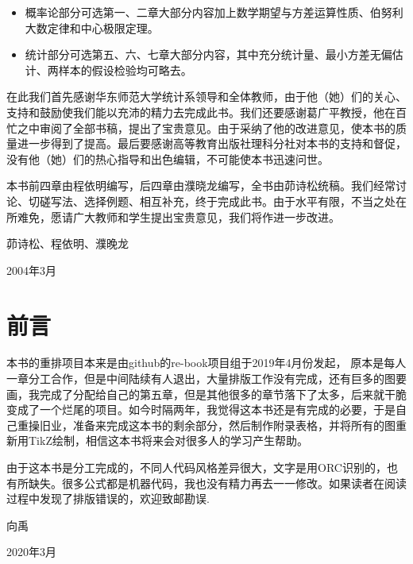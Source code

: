 \begin{itemize}
  \item 概率论部分可选第一、二章大部分内容加上数学期望与方差运算性质、伯努利大数定律和中心极限定理。
  \item 统计部分可选第五、六、七章大部分内容，其中充分统计量、最小方差无偏估计、两样本的假设检验均可略去。
\end{itemize}

在此我们首先感谢华东师范大学统计系领导和全体教师，由于他（她）们的关心、支持和鼓励使我们能以充沛的精力去完成此书。我们还要感谢葛广平教授，他在百忙之中审阅了全部书稿，提出了宝贵意见。由于采纳了他的改进意见，使本书的质量进一步得到了提高。最后要感谢高等教育出版社理科分社对本书的支持和督促，没有他（她）们的热心指导和出色编辑，不可能使本书迅速问世。

本书前四章由程依明编写，后四章由濮晓龙编写，全书由茆诗松统稿。我们经常讨论、切磋写法、选择例题、相互补充，终于完成此书。由于水平有限，不当之处在所难免，愿请广大教师和学生提出宝贵意见，我们将作进一步改进。

\hfill 茆诗松、程依明、濮晚龙

\hfill 2004年3月 \hspace{0.8cm}

\chapter*{前言}
本书的重排项目本来是由github的re-book项目组于2019年4月份发起， 原本是每人一章分工合作，但是中间陆续有人退出，大量排版工作没有完成，还有巨多的图要画，我完成了分配给自己的第五章，但是其他很多的章节落下了太多，后来就干脆变成了一个烂尾的项目。如今时隔两年，我觉得这本书还是有完成的必要，于是自己重操旧业，准备来完成这本书的剩余部分，然后制作附录表格，并将所有的图重新用TikZ绘制，相信这本书将来会对很多人的学习产生帮助。

由于这本书是分工完成的，不同人代码风格差异很大，文字是用ORC识别的，也有所缺失。很多公式都是机器代码，我也没有精力再去一一修改。如果读者在阅读过程中发现了排版错误的，欢迎致邮勘误. \href{mailto:739049687@qq.com}{}

\hfill 向禹\hspace{2em}

\hfill 2020年3月
